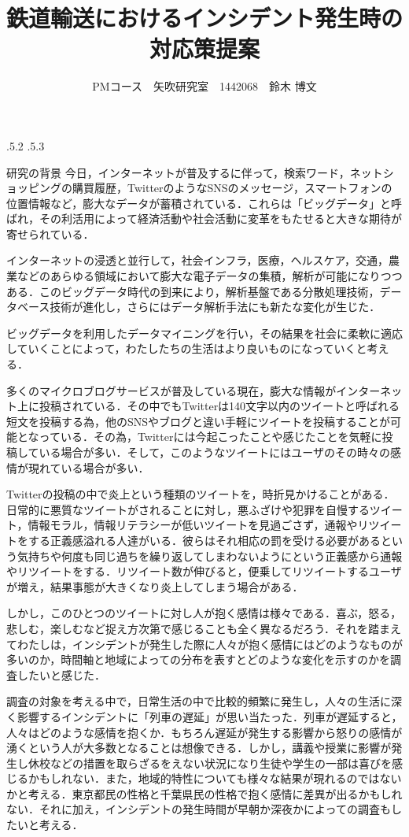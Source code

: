 \documentclass[uplatex]{jsarticle}
\title{\vspace{-14mm}鉄道輸送におけるインシデント発生時の対応策提案}
\author{PMコース　矢吹研究室　1442068　鈴木 博文}
\date{}%
\makeatletter
\renewcommand{\section}{%
    \if@slide\clearpage\fi
    \@startsection{section}{1}{\z@}%
    {\Cvs \@plus.5\Cdp \@minus.2\Cdp}%
    {.5\Cvs \@plus.3\Cdp}%
    {\normalfont\raggedright}}
\makeatother
\begin{document}
\maketitle


\section{研究の背景}
今日，インターネットが普及するに伴って，検索ワード，ネットショッピングの購買履歴，TwitterのようなSNSのメッセージ，スマートフォンの位置情報など，膨大なデータが蓄積されている．これらは「ビッグデータ」と呼ばれ，その利活用によって経済活動や社会活動に変革をもたせると大きな期待が寄せられている．

インターネットの浸透と並行して，社会インフラ，医療，ヘルスケア，交通，農業などのあらゆる領域において膨大な電子データの集積，解析が可能になりつつある．このビッグデータ時代の到来により，解析基盤である分散処理技術，データベース技術が進化し，さらにはデータ解析手法にも新たな変化が生じた\cite{bib1}．

ビッグデータを利用したデータマイニングを行い，その結果を社会に柔軟に適応していくことによって，わたしたちの生活はより良いものになっていくと考える．

多くのマイクロブログサービスが普及している現在，膨大な情報がインターネット上に投稿されている．その中でもTwitterは140文字以内のツイートと呼ばれる短文を投稿する為，他のSNSやブログと違い手軽にツイートを投稿することが可能となっている．その為，Twitterには今起こったことや感じたことを気軽に投稿している場合が多い．そして，このようなツイートにはユーザのその時々の感情が現れている場合が多い\cite{bib2}．

Twitterの投稿の中で炎上という種類のツイートを，時折見かけることがある．日常的に悪質なツイートがされることに対し，悪ふざけや犯罪を自慢するツイート，情報モラル，情報リテラシーが低いツイートを見過ごさず，通報やリツイートをする正義感溢れる人達がいる．彼らはそれ相応の罰を受ける必要があるという気持ちや何度も同じ過ちを繰り返してしまわないようにという正義感から通報やリツイートをする．リツイート数が伸びると，便乗してリツイートするユーザが増え，結果事態が大きくなり炎上してしまう場合がある\cite{bib3}．

しかし，このひとつのツイートに対し人が抱く感情は様々である．喜ぶ，怒る，悲しむ，楽しむなど捉え方次第で感じることも全く異なるだろう．それを踏まえてわたしは，インシデントが発生した際に人々が抱く感情にはどのようなものが多いのか，時間軸と地域によっての分布を表すとどのような変化を示すのかを調査したいと感じた．

調査の対象を考える中で，日常生活の中で比較的頻繁に発生し，人々の生活に深く影響するインシデントに「列車の遅延」が思い当たった．列車が遅延すると，人々はどのような感情を抱くか．もちろん遅延が発生する影響から怒りの感情が湧くという人が大多数となることは想像できる．しかし，講義や授業に影響が発生し休校などの措置を取らざるをえない状況になり生徒や学生の一部は喜びを感じるかもしれない．また，地域的特性についても様々な結果が現れるのではないかと考える．東京都民の性格と千葉県民の性格で抱く感情に差異が出るかもしれない．それに加え，インシデントの発生時間が早朝か深夜かによっての調査もしたいと考える．
\end{document}
